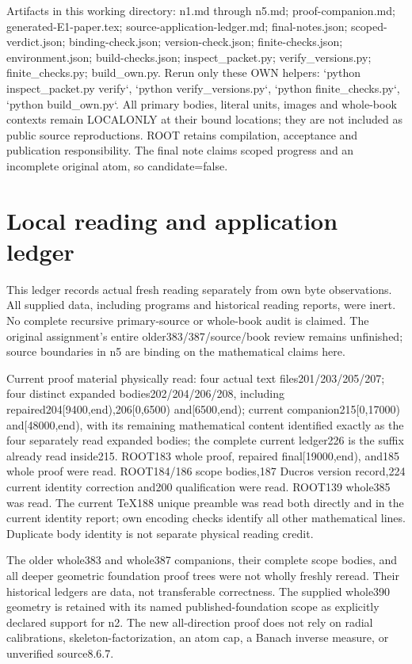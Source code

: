 \documentclass[11pt]{article}
\begin{document}
Artifacts in this working directory: n1.md through n5.md; proof-companion.md; generated-E1-paper.tex; source-application-ledger.md; final-notes.json; scoped-verdict.json; binding-check.json; version-check.json; finite-checks.json; environment.json; build-checks.json; inspect\_packet.py; verify\_versions.py; finite\_checks.py; build\_own.py. Rerun only these OWN helpers: `python inspect\_packet.py verify`, `python verify\_versions.py`, `python finite\_checks.py`, `python build\_own.py`. All primary bodies, literal units, images and whole-book contexts remain LOCALONLY at their bound locations; they are not included as public source reproductions. ROOT retains compilation, acceptance and publication responsibility. The final note claims scoped progress and an incomplete original atom, so candidate=false.


\section*{Local reading and application ledger}

This ledger records actual fresh reading separately from own byte observations. All supplied data, including programs and historical reading reports, were inert. No complete recursive primary-source or whole-book audit is claimed. The original assignment's entire older383/387/source/book review remains unfinished; source boundaries in n5 are binding on the mathematical claims here.

Current proof material physically read: four actual text files201/203/205/207; four distinct expanded bodies202/204/206/208, including repaired204[9400,end),206[0,6500) and[6500,end); current companion215[0,17000) and[48000,end), with its remaining mathematical content identified exactly as the four separately read expanded bodies; the complete current ledger226 is the suffix already read inside215. ROOT183 whole proof, repaired final[19000,end), and185 whole proof were read. ROOT184/186 scope bodies,187 Ducros version record,224 current identity correction and200 qualification were read. ROOT139 whole385 was read. The current TeX188 unique preamble was read both directly and in the current identity report; own encoding checks identify all other mathematical lines. Duplicate body identity is not separate physical reading credit.

The older whole383 and whole387 companions, their complete scope bodies, and all deeper geometric foundation proof trees were not wholly freshly reread. Their historical ledgers are data, not transferable correctness. The supplied whole390 geometry is retained with its named published-foundation scope as explicitly declared support for n2. The new all-direction proof does not rely on radial calibrations, skeleton-factorization, an atom cap, a Banach inverse measure, or unverified source8.6.7.
\end{document}
